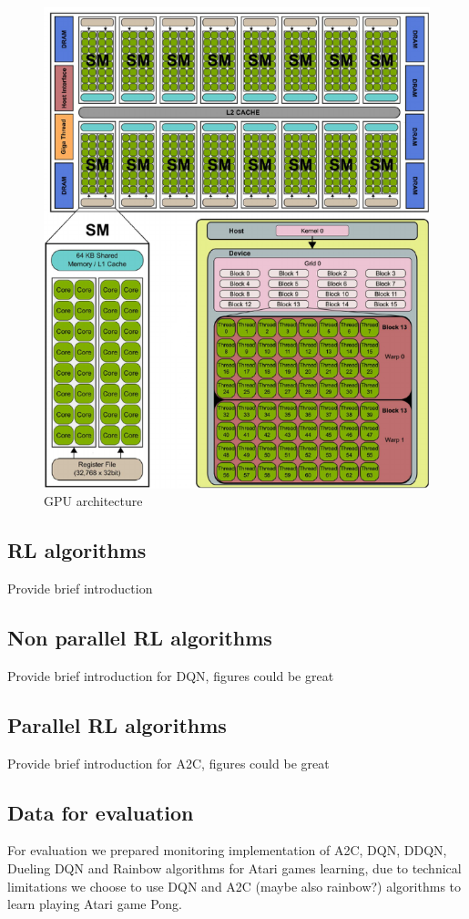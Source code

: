 \documentclass[11 pt, twocolumn]{article}
\begin{document}
\begin{figure}
\centering
\includegraphics[width=0.93\columnwidth]{gpu_arch.png}
\caption{GPU architecture}
\vspace*{2pt}
\end{figure}

\subsection{RL algorithms}
Provide brief introduction
\subsection{Non parallel RL algorithms}
Provide brief introduction for DQN, figures could be great
\subsection{Parallel RL algorithms}
Provide brief introduction for A2C, figures could be great
\subsection{Data for evaluation}
For evaluation we prepared monitoring implementation of A2C, DQN, DDQN, Dueling DQN and Rainbow algorithms for Atari games learning, due to technical limitations we choose to use DQN and A2C (maybe also rainbow?) algorithms to learn playing Atari game Pong.
\end{document}
